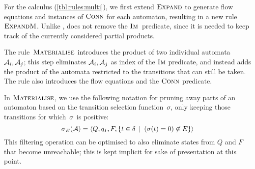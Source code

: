 \begin{table}[t]
      \caption{Additional derivation rules for products of arbitrarily many automata.}\label{tbl:rules:multi}
    \end{table}

    For the calculus (\cref{tbl:rules:multi}), we first extend
    $\textsc{Expand}$ to generate flow equations and instances of $\operatorname{\textsc{Conn}}$
    for each automaton, resulting in a new rule $\textsc{ExpandM}$.  Unlike
    \Expand{}, \ExpandM{} does not remove the $\operatorname{\textsc{Im}}$~predicate,
    since it is needed to keep track of the currently considered
    partial products.


The rule~$\textsc{Materialise}$ introduces the product of two individual
automata~$\mathcal{A}_i, \mathcal{A}_j$; this step eliminates
$\mathcal{A}_i, \mathcal{A}_j$ as index of the $\operatorname{\textsc{Im}}$ predicate, and
instead adds the product of the automata restricted to the
transitions that can still be taken. The rule
also introduces the flow equations and the $\operatorname{\textsc{Conn}}$ predicate.

In $\textsc{Materialise}$, we use the following notation for pruning away
parts of an automaton based on the transition selection
function~$\sigma$, only keeping those transitions for which~$\operatorname{\sigma}$
is positive:
\begin{equation*}
  \operatorname{\sigma}_{E}(\mathcal{A}) =
  \left\langle Q, q_I, F,
\left\{t \in \delta \:\mid\: (\operatorname{\sigma}(t) = 0) \not\in E\right\}\right\rangle
\end{equation*}
This filtering operation can be optimised to also eliminate states from
$Q$ and $F$ that become unreachable; this is kept implicit for sake of
presentation at this point.


